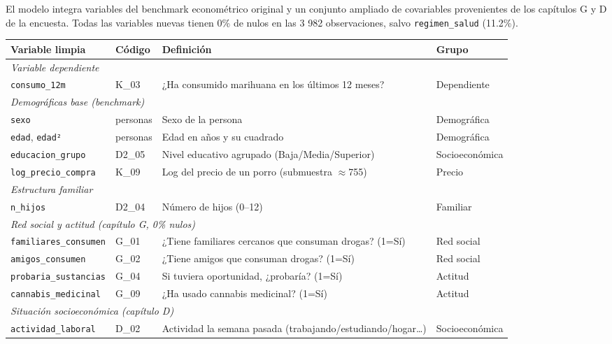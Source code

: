 \documentclass[12pt, a4paper]{article}
\begin{document}
El modelo integra variables del benchmark econométrico original y un conjunto ampliado de covariables provenientes de los capítulos G y D de la encuesta. Todas las variables nuevas tienen 0\% de nulos en las 3 982 observaciones, salvo \texttt{regimen\_salud} (11.2\%).

\begin{table}[H]
\centering
\small
\begin{tabular}{p{2.9cm} p{1.5cm} p{5.8cm} p{3.2cm}}
\toprule
\textbf{Variable limpia} & \textbf{Código} & \textbf{Definición} & \textbf{Grupo} \\
\midrule
\multicolumn{4}{l}{\textit{Variable dependiente}} \\
\texttt{consumo\_12m} & K\_03 & ¿Ha consumido marihuana en los últimos 12 meses? & Dependiente \\
\midrule
\multicolumn{4}{l}{\textit{Demográficas base (benchmark)}} \\
\texttt{sexo} & personas & Sexo de la persona & Demográfica \\
\texttt{edad}, \texttt{edad²} & personas & Edad en años y su cuadrado & Demográfica \\
\texttt{educacion\_grupo} & D2\_05 & Nivel educativo agrupado (Baja/Media/Superior) & Socioeconómica \\
\texttt{log\_precio\_compra} & K\_09 & Log del precio de un porro (submuestra \(\approx\)755) & Precio \\
\midrule
\multicolumn{4}{l}{\textit{Estructura familiar}} \\
\texttt{n\_hijos} & D2\_04 & Número de hijos (0--12) & Familiar \\
\midrule
\multicolumn{4}{l}{\textit{Red social y actitud (capítulo G, 0\% nulos)}} \\
\texttt{familiares\_consumen} & G\_01 & ¿Tiene familiares cercanos que consuman drogas? (1=Sí) & Red social \\
\texttt{amigos\_consumen} & G\_02 & ¿Tiene amigos que consuman drogas? (1=Sí) & Red social \\
\texttt{probaria\_sustancias} & G\_04 & Si tuviera oportunidad, ¿probaría? (1=Sí) & Actitud \\
\texttt{cannabis\_medicinal} & G\_09 & ¿Ha usado cannabis medicinal? (1=Sí) & Actitud \\
\midrule
\multicolumn{4}{l}{\textit{Situación socioeconómica (capítulo D)}} \\
\texttt{actividad\_laboral} & D\_02 & Actividad la semana pasada (trabajando/estudiando/hogar\ldots) & Socioeconómica \\

\end{tabular}
\end{table}
\end{document}
